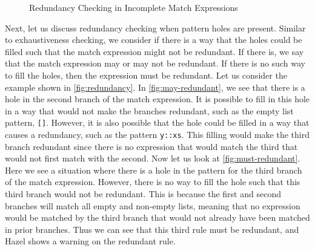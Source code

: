 \begin{figure}[h]
  \centering
    \hfill
  \caption{Redundancy Checking in Incomplete Match Expressions}
  \label{fig:redundancy}
\end{figure}

Next, let us discuss redundancy checking when pattern holes are present. Similar to exhaustiveness checking, we consider if there is a way that the holes could be filled such that the match expression might not be redundant. If there is, we say that the match expression may or may not be redundant. If there is no such way to fill the holes, then the expression must be redundant. Let us consider the example shown in \autoref{fig:redundancy}. In \autoref{fig:may-redundant}, we see that there is a hole in the second branch of the match expression. It is possible to fill in this hole in a way that would not make the branches redundant, such as the empty list pattern, \texttt{[]}. However, it is also possible that the hole could be filled in a way that causes a redundancy, such as the pattern \texttt{y::xs}. This filling would make the third branch redundant since there is no expression that would match the third that would not first match with the second. Now let us look at \autoref{fig:must-redundant}. Here we see a situation where there is a hole in the pattern for the third branch of the match expression. However, there is no way to fill the hole such that this third branch would not be redundant. This is because the first and second branches will match all empty and non-empty lists, meaning that no expression would be matched by the third branch that would not already have been matched in prior branches. Thus we can see that this third rule must be redundant, and Hazel shows a warning on the redundant rule.

